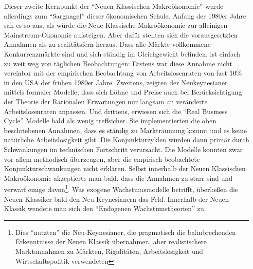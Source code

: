 \begin{enumerate}
	Dieser zweite Kernpunkt der "`Neuen Klassischen Makroökonomie"' wurde allerdings zum "`Sargnagel"' dieser ökonomischen Schule. Anfang der 1980er Jahre sah es so aus, als würde die Neue Klassische Makroökonomie zur alleinigen Mainstream-Ökonomie aufsteigen. Aber dafür stellten sich die vorausgesetzten Annahmen als zu realitätsfern heraus. Dass alle Märkte vollkommene Konkurrenzmärkte sind und sich ständig im Gleichgewicht befinden, ist einfach zu weit weg von täglichen Beobachtungen: Erstens war diese Annahme nicht vereinbar mit der empirischen Beobachtung von Arbeitslosenraten von fast 10\% in den USA der frühen 1980er Jahre. Zweitens, zeigten der Neukeynesianer \textcite{Fischer1977} mittels formaler Modelle, dass sich Löhne und Preise auch bei Berücksichtigung der Theorie der Rationalen Erwartungen nur langsam an veränderte Arbeitslosenraten anpassen.
	Und drittens, erwiesen sich die "`Real Business Cycle"' Modelle bald als wenig treffsicher. Sie implementierten die oben beschriebenen Annahmen, dass es ständig zu Markträumung kommt und es keine natürliche Arbeitslosigkeit gibt. Die Konjunkturzyklen würden dann primär durch Schwankungen im technischen Fortschritt verursacht. Die Modelle konnten zwar vor allem methodisch überzeugen, aber die empirisch beobachtete Konjunkturschwankungen nicht erklären.
	Selbst innerhalb der Neuen Klassischen Makroökonomie akzeptierte man bald, dass die Annahmen zu starr sind und verwarf einige davon\footnote{Dies "`nutzten"' die Neu-Keynesianer, die pragmatisch die bahnbrechenden Erkenntnisse der Neuen Klassik übernahmen, aber realistischere Marktannahmen zu Märkten, Rigiditäten, Arbeitslosigkeit und Wirtschaftspolitik verwendeten}. Was exogene Wachstumsmodelle betrifft, überließen die Neuen Klassiker bald den Neu-Keynesianern das Feld. Innerhalb der Neuen Klassik wendete man sich den "`Endogenen Wachstumstheorien"' zu.
	

\end{enumerate}
